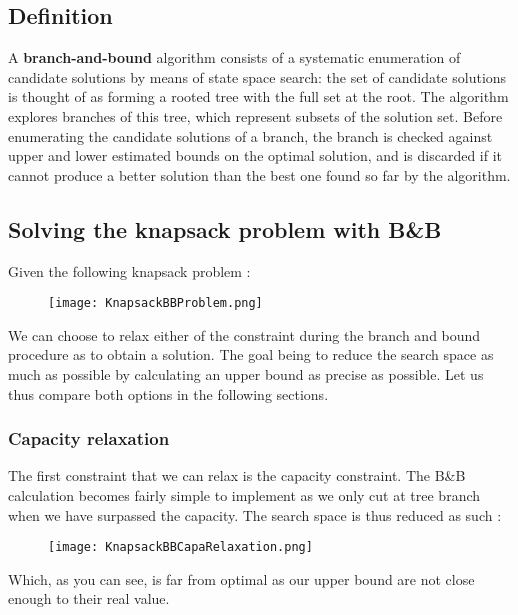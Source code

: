 
\subsection{Definition}

A \textbf{branch-and-bound} algorithm consists of a systematic enumeration of
candidate solutions by means of state space search: the set of candidate
solutions is thought of as forming a rooted tree with the full set at the root.
The algorithm explores branches of this tree, which represent subsets of the
solution set. Before enumerating the candidate solutions of a branch, the
branch is checked against upper and lower estimated bounds on the optimal
solution, and is discarded if it cannot produce a better solution than the best
one found so far by the algorithm.

\subsection{Solving the knapsack problem with B\&B}

Given the following knapsack problem :

\begin{figure}[!ht]
    \centering
    \texttt{[image: KnapsackBBProblem.png]}
    \label{fig:Knapsack_example}
\end{figure}
\FloatBarrier

We can choose to relax either of the constraint during the branch and bound procedure 
as to obtain a solution. The goal being to reduce the search space as much as possible
by calculating an upper bound as precise as possible.
Let us thus compare both options in the following sections.

\subsubsection{Capacity relaxation}

The first constraint that we can relax is the capacity constraint. The B\&B
calculation becomes fairly simple to implement as we only cut at tree branch when 
we have surpassed the capacity. The search space is thus reduced as such :

\begin{figure}[!ht]
    \centering
    \texttt{[image: KnapsackBBCapaRelaxation.png]}
    \label{fig:Knapsack_example}
\end{figure}
\FloatBarrier

Which, as you can see, is far from optimal as our upper bound are not close enough to their
real value.

